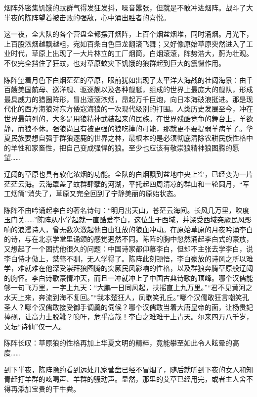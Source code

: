 \par 烟阵外密集饥饿的蚊群气得发狂发抖，噪音嚣张，但就是不敢冲进烟阵。战斗了大半夜的陈阵望着被击败的强敌，心中涌出胜者的喜悦。
\par 这一夜，全大队的各个营盘全都摆开烟阵，上百个烟盆烟堆，同时涌烟。月光下，上百股浓烟越飘越粗，宛如百条白色巨龙翻滚飞舞；又好像原始草原突然进入了工业时代，草原上出现了一大片林立的工厂烟筒，白烟滚滚，阵势浩大，蔚为壮观。不仅完全挡住了狂蚊，也对草原蚊灾下饥饿的狼群起到巨大的震慑作用。
\par 陈阵望着月色下白烟茫茫的草原，眼前犹如出现了太平洋大海战的壮阔海景：由千百艘美国航母、巡洋舰、驱逐舰以及各种舰艇，组成的世界上最庞大的舰队，形成最具威力的猎圈阵形，冒出滚滚浓烟，昂起万千巨炮，向日本海破浪挺进。那是现代化的西方海狼对东方倭寇海狼的一次现代级别的打围。人类历史发展至今，冲在世界最前列的，大多是用狼精神武装起来的民族。在世界残酷竞争的舞台上，羊欲静，而狼不休。强狼尚且有被更强的狼吃掉的可能，那就更不要提弱羊病羊了。华夏民族要想自强于群狼逐鹿的世界之林，最根本的是必须彻底清除农耕民族性格中的羊性和家畜性，把自己变成强悍的狼。至少也应该有敬崇狼精神狼图腾的愿望……
\par 辽阔的草原也具有软化浓烟的功能。全队的白烟飘到盆地中央上空，已经变为一片茫茫云海。云海罩盖了蚊群肆孽的河湖，平托起四周清凉的群山和一轮圆月，“军工烟筒”消失了，草原又完全回到了宁静美丽的原始状态。
\par 陈阵不由吟诵起李白的著名诗句：“明月出天山，苍茫云海间。长风几万里，吹度玉门关……”陈阵从小学起就一直酷爱李白，这位生于西域，并深受西域突厥民风影响的浪漫诗人，曾无数次激起他自由狂放的狼血冲动。在原始草原的月夜吟诵李白的诗，与在北京学堂里诵颂的感觉迥然不同。陈阵的胸中忽然涌起李白式的豪放，又想起了一个困扰他很久的问题：中国诗家都仰慕李白，但却不主张去学李白，说李白恃才傲上，桀骜不驯，无人学得了。陈阵此刻顿悟，李白豪放的诗风之所以难学，难就难在他深受崇拜狼图腾的突厥民风影响的性格，以及群狼奔腾草原般辽阔的胸怀。李白诗歌豪情冲天，而且一冲就冲上了中国古典诗歌的顶峰。哪个汉儒能够一句飞万里，一字上九天：“大鹏一日同风起，扶摇直上九万里。”“君不见黄河之水天上来，奔流到海不复回。”“我本楚狂人，凤歌笑孔丘。”哪个汉儒敢狂言嘲笑孔圣人？哪个汉儒敢接受御手调羹的伺候？哪个汉儒敢当着大唐皇帝的面，让杨贵妃捧砚，让高力士脱靴？噫吁，危乎高哉！李白之难难于上青天。尔来四万八千岁，文坛“诗仙”仅一人。
\par 陈阵长叹：草原狼的性格再加上华夏文明的精粹，竟能攀至如此令人眩晕的高度……
\par 
\par 到下半夜，陈阵隐约看到远处几家营盘已经不冒烟了，随后就听到下夜的女人和知青赶打羊群的吆喝声、羊群的骚动声。显然，那里的艾草已经用完，或者主人舍不得再添加宝贵的干牛粪。
